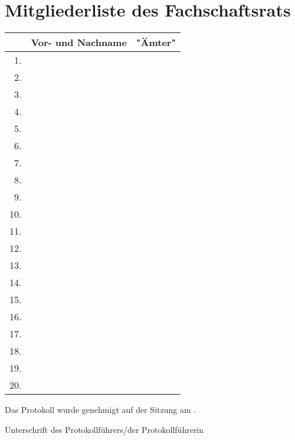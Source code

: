 \documentclass[sitzung=fsv-konstituierend]{fsphys-protokoll}
\begin{document}
\section{Mitgliederliste des Fachschaftsrats}
\begin{longtable}{| r @{ } l | >{\raggedright\arraybackslash}m{10cm} |}
	\hline
	& Vor- und Nachname & "Ämter"
	\\ \hline\hline
	\endhead
	1.  & 
	&
	\\ \hline
	2.  & 
	&
	\\ \hline
	3.  & 
	&
	\\ \hline
	4.  & 
	&
	\\ \hline
	5.  & 
	&
	\\ \hline
	6.  & 
	&
	\\ \hline
	7.  & 
	&
	\\ \hline
	8.  & 
	&
	\\ \hline
	9.  & 
	&
	\\ \hline
	10. & 
	&
	\\ \hline
	11. & 
	&
	\\ \hline
	12. & 
	&
	\\ \hline
	13. & 
	&
	\\ \hline
	14. & 
	&
	\\ \hline
	15. & 
	&
	\\ \hline
	16. & 
	&
	\\ \hline
	17. & 
	&
	\\ \hline
	18. & 
	&
	\\ \hline
	19. & 
	&
	\\ \hline
	20. & 
	&
	\\ \hline
\end{longtable}

\bigskip
\bigskip
Das Protokoll wurde genehmigt auf der Sitzung am \protokollformatteddate.

\vspace{2cm}
Unterschrift des Protokollführers/der Protokollführerin
\end{document}
